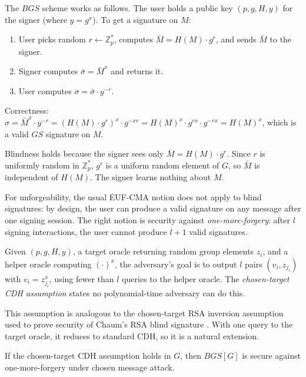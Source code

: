 The $BGS$ scheme works as follows. The user holds a public key $(p, g, H, y)$ for the
signer (where $y = g^x$). To get a signature on $M$:
\begin{enumerate}
    \item User picks random $r \leftarrow \mathbb{Z}_p^*$, computes $\bar{M} =
    H(M) \cdot g^r$, and sends $\bar{M}$ to the signer.
    \item Signer computes $\bar{\sigma} = \bar{M}^x$ and returns it.
    \item User computes $\sigma = \bar{\sigma} \cdot y^{-r}$.
\end{enumerate}

Correctness: $\sigma = \bar{M}^x \cdot y^{-r} = (H(M) \cdot g^r)^x \cdot g^{-xr} =
H(M)^x \cdot g^{rx} \cdot g^{-rx} = H(M)^x$, which is a valid $GS$ signature on $M$.

Blindness holds because the signer sees only $\bar{M} = H(M) \cdot g^r$. Since $r$ is
uniformly random in $\mathbb{Z}_p^*$, $g^r$ is a uniform random element of $G$, so
$\bar{M}$ is independent of $H(M)$. The signer learns nothing about $M$.

For unforgeability, the usual EUF-CMA notion does not apply to blind signatures: by
design, the user can produce a valid signature on any message after one signing session.
The right notion is security against \emph{one-more-forgery}: after $l$ signing
interactions, the user cannot produce $l+1$ valid signatures.

\begin{definition}
Given $(p, g, H, y)$, a target oracle returning random group elements $z_i$, and a helper
oracle computing $(\cdot)^x$, the adversary's goal is to output $l$ pairs $(v_i, z_{j_i})$
with $v_i = z_{j_i}^x$, using fewer than $l$ queries to the helper oracle.
The \emph{chosen-target CDH assumption} states no polynomial-time adversary can do this.
\end{definition}

This assumption is analogous to the chosen-target RSA inversion assumption used to prove
security of Chaum's RSA blind signature \cite{BNPS}. With one query to the target oracle,
it reduces to standard CDH, so it is a natural extension.

\begin{theorem}
If the chosen-target CDH assumption holds in $G$, then $BGS[G]$ is secure against
one-more-forgery under chosen message attack.
\end{theorem}

